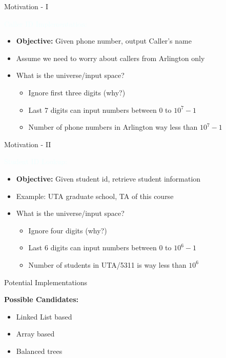 \documentclass{beamer}
\newcommand{\tblue}[1]{{\Large {\textcolor{azure}{#1}}}}
\begin{document}
\begin{frame}{Motivation - I}

    \tblue{Caller ID Implementation:} 
    \begin{itemize}
        \item {\bf Objective:} Given phone number, output Caller's name
        \item Assume we need to worry about callers from Arlington only 
        \item What is the universe/input space? \pause
        \begin{itemize}
            \item Ignore first three digits (why?)
            \item Last 7 digits can input numbers between $0$ to $10^7-1$ 
            \item Number of phone numbers in Arlington way less than $10^7-1$
        \end{itemize}
    \end{itemize}
\end{frame}

\begin{frame}{Motivation - II}

    \tblue{Student ID Lookup:} 
    \begin{itemize}
        \item {\bf Objective:} Given student id, retrieve student information 
        \item Example: UTA graduate school, TA of this course
        \item What is the universe/input space? \pause
        \begin{itemize}
            \item Ignore four digits (why?)
            \item Last 6 digits can input numbers between $0$ to $10^6-1$ 
            \item Number of students in UTA/5311 is way less than $10^6$
        \end{itemize}
    \end{itemize}
\end{frame}


\begin{frame}{Potential Implementations}

    {\bf Possible Candidates:} \pause
    \begin{itemize}
        \item Linked List based
        \item Array based 
        \item Balanced trees
    \end{itemize}
\end{frame}
\end{document}
